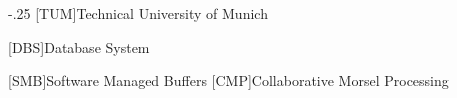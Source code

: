 \documentclass[headsepline,footsepline,footinclude=false,oneside,fontsize=11pt,paper=a4,listof=totoc,bibliography=totoc]{scrbook} %
\begin{document}


\frontmatter{}





\tableofcontents{}

\mainmatter{}








\appendix{}


\begin{acronym}
	\itemsep-.25\baselineskip
	[TUM]{Technical University of Munich}

	[DBS]{Database System}

	[SMB]{Software Managed Buffers}
	[CMP]{Collaborative Morsel Processing}
\end{acronym}

\listoffigures{}
\listoftables{}
\printbibliography{}
\end{document}
